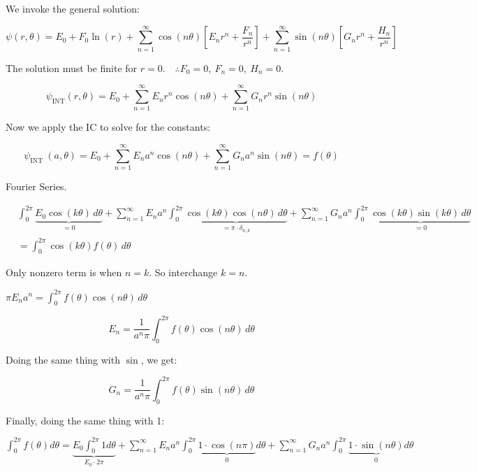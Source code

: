 \documentclass{report}
\begin{document}
We invoke the general solution:

$$
\psi(r, \theta)=E_{0}+F_{0} \ln (r)+\sum\limits_{n=1}^{\infty} \cos (n \theta)\left[E_{n} r^{n}+\dfrac{F_{n}}{r^{n}}\right]+\sum\limits_{n=1}^{\infty} \sin (n \theta)\left[G_{n} r^{n}+\dfrac{H_{n}}{r^{n}}\right]
$$

The solution must be finite for $r=0.\quad \therefore F_{0}=0,\ F_{n}=0,\ H_{n}=0$.

\[
\boxed{
\psi_{\text{INT}}(r, \theta)=E_{0}+\sum_{n=1}^{\infty}E_{n}r^{n}\cos(n\theta)
+\sum_{n=1}^{\infty}G_{n}r^{n}\sin(n\theta)
}
\]

Now we apply the IC to solve for the constants:

$$
\psi_{\text {INT }}(a, \theta)=E_{0}+\sum\limits_{n=1}^{\infty} E_{n} a^{n} \cos (n \theta)+\sum\limits_{n=1}^{\infty} G_{n} a^{n} \sin (n \theta)=f(\theta)
$$

Fourier Series.

$$
\begin{aligned}
& \displaystyle\int_{0}^{2 \pi} \underbrace{E_{0} \cos (k \theta)\, d\theta}_{=0}
+\sum\limits_{n=1}^{\infty} E_{n} a^{n} \displaystyle\int_{0}^{2 \pi} \underbrace{\cos (k \theta) \cos (n \theta)\, d\theta}_{=\pi\cdot \delta_{n,k}}
+\sum\limits_{n=1}^{\infty} G_{n} a^{n} \displaystyle\int_{0}^{2 \pi} \underbrace{\cos (k \theta) \sin (k \theta)\, d\theta}_{=0} \\
& =\displaystyle\int_{0}^{2 \pi} \cos (k \theta) f(\theta)\, d\theta
\end{aligned}
$$

Only nonzero term is when $n=k$. So interchange $k=n$.

$\pi E_{n} a^{n}=\displaystyle\int_{0}^{2 \pi} f(\theta) \cos (n \theta)\, d\theta$

\begin{equation}\tag{1}
\boxed{E_{n}=\dfrac{1}{a^{n} \pi} \displaystyle\int_{0}^{2 \pi} f(\theta) \cos (n \theta)\, d\theta}
\end{equation}

Doing the same thing with $\sin$, we get:

\begin{equation}\tag{2}
\boxed{G_{n}=\dfrac{1}{a^{n} \pi} \displaystyle\int_{0}^{2 \pi} f(\theta) \sin(n \theta)\, d\theta}
\end{equation}

Finally, doing the same thing with 1:

$\displaystyle\int_{0}^{2 \pi} f(\theta) d \theta=\underbrace{E_{0} \displaystyle\int_{0}^{2 \pi} 1 d \theta}_{E_0\cdot 2\pi}+\sum\limits_{n=1}^{\infty} E_{n} a^{n} \displaystyle\int_{0}^{2 \pi} \underbrace{1 \cdot \cos (n \pi)}_{0} d \theta+\sum\limits_{n=1}^{\infty} G_{n} a^{n} \displaystyle\int_{0}^{2 \pi} \underbrace{1 \cdot \sin (n \theta)}_{0} d \theta$
\end{document}
